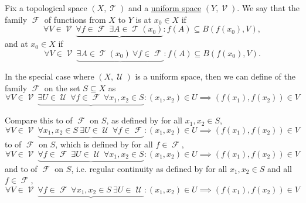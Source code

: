 \begin{definition}\label{def:function_set_continuity}\mcite\cite[285]{Bouziad2004}
  Fix a topological space \( (X, \mscrT) \) and a \hyperref[def:uniform_space]{uniform space} \( (Y, \mscrV) \). We say that the family \( \mscrF \) of functions from \( X \) to \( Y \) is  at \( x_0 \in X \) if
  \begin{equation}\label{def:function_set_continuity/functionwise}
    \forall V \in \mscrV \ \underbrace{\forall f \in \mscrF \ \exists A \in \mscrT(x_0)} : f(A) \subseteq B(f(x_0), V),
  \end{equation}
  and  at \( x_0 \in X \) if
  \begin{equation}\label{def:function_set_continuity/equicontinuous}
    \forall V \in \mscrV \ \underbrace{\exists A \in \mscrT(x_0) \ \forall f \in \mscrF} : f(A) \subseteq B(f(x_0), V).
  \end{equation}

  In the special case where \( (X, \mscrU) \) is a uniform space, then we can define  of the family \( \mscrF \) on the set \( S \subseteq X \) as
  \begin{equation}\label{def:function_set_continuity/uniform_equicontinuous}
    \forall V \in \mscrV \ \underbrace{\exists U \in \mscrU \ \forall f \in \mscrF \ \forall x_1, x_2 \in S} : (x_1, x_2) \in U \implies (f(x_1), f(x_2)) \in V
  \end{equation}

  Compare this to  of \( \mscrF \) on \( S \), as defined by  for all \( x_1, x_2 \in S \),
  \begin{equation}\label{def:function_set_continuity/pointwise_equicontinuous}
    \forall V \in \mscrV \ \underbrace{\forall x_1, x_2 \in S \ \exists U \in \mscrU \ \forall f \in \mscrF} : (x_1, x_2) \in U \implies (f(x_1), f(x_2)) \in V
  \end{equation}
  to  of \( \mscrF \) on \( S \), which is defined by  for all \( f \in \mscrF \),
  \begin{equation}\label{def:function_set_continuity/uniform_functionwise}
    \forall V \in \mscrV \ \underbrace{\forall f \in \mscrF \ \exists U \in \mscrU \ \forall x_1, x_2 \in S} : (x_1, x_2) \in U \implies (f(x_1), f(x_2)) \in V
  \end{equation}
  and to  of \( \mscrF \) on \( S \), i.e. regular continuity as defined by  for all \( x_1, x_2 \in S \) and all \( f \in \mscrF \),
  \begin{equation}\label{def:function_set_continuity/functionwise_pointwise}
    \forall V \in \mscrV \ \underbrace{\forall f \in \mscrF \ \forall x_1, x_2 \in S \ \exists U \in \mscrU} : (x_1, x_2) \in U \implies (f(x_1), f(x_2)) \in V
  \end{equation}
\end{definition}

